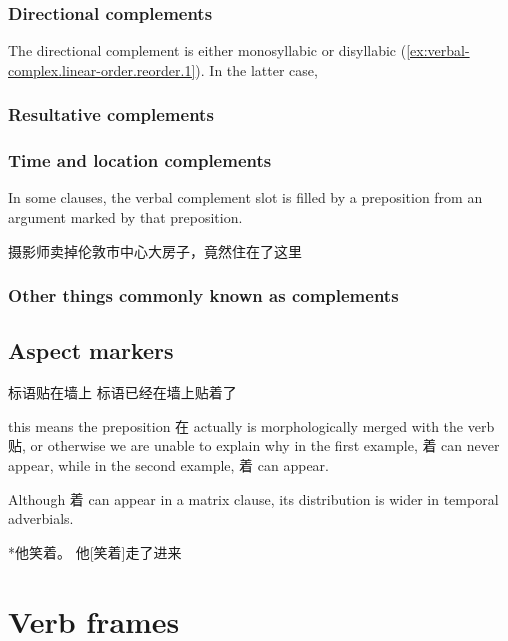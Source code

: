 \documentclass[UTF8, a4paper, oneside, scheme=plain, 12pt]{ctexrep}
\begin{document}
\subsection{Directional complements}\label{sec:verbal-complex.directional}

The directional complement is either monosyllabic or disyllabic
(\ref{ex:verbal-complex.linear-order.reorder.1}).
In the latter case, 

\subsection{Resultative complements}\label{sec:verbal-complex.resultative}

\subsection{Time and location complements}\label{sec:verbal-complex.prepositional}

In some clauses, the verbal complement slot is filled by a preposition
from an argument marked by that preposition.

\begin{exe}
    \ex 摄影师卖掉伦敦市中心大房子，竟然住在了这里
\end{exe}

\subsection{Other things commonly known as complements}

\section{Aspect markers}

\begin{exe}
    \ex 标语贴在墙上 
    \ex 标语已经在墙上贴着了
\end{exe}
 
this means the preposition 在 actually is morphologically merged with the verb 贴, 
or otherwise we are unable to explain why 
in the first example, 着 can never appear, 
while in the second example, 着 can appear.

Although 着 can appear in a matrix clause, 
its distribution is wider in temporal adverbials. 

*他笑着。
他[笑着]走了进来

\chapter{Verb frames}\label{chap:verb-frames}
\end{document}
